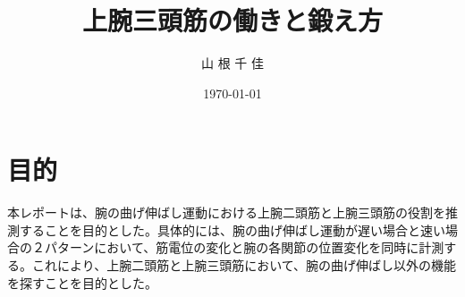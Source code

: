 \documentclass{jsarticle}
\title{上腕三頭筋の働きと鍛え方}
\date{\today}
\author{山 根 千 佳}
\begin{document}
%

\maketitle


\section{目的}
本レポートは、腕の曲げ伸ばし運動における上腕二頭筋と上腕三頭筋の役割を推測することを目的とした。具体的には、腕の曲げ伸ばし運動が遅い場合と速い場合の２パターンにおいて、筋電位の変化と腕の各関節の位置変化を同時に計測する。これにより、上腕二頭筋と上腕三頭筋において、腕の曲げ伸ばし以外の機能を探すことを目的とした。
\end{document}
